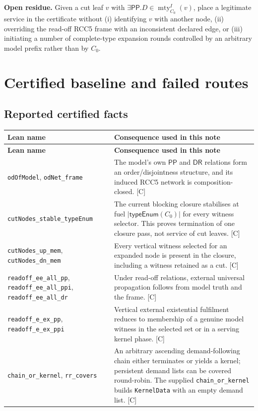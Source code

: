 \documentclass[11pt,letterpaper]{article}
\newcommand{\DR}{\ensuremath{\mathsf{DR}}}
\newcommand{\PP}{\ensuremath{\mathsf{PP}}}
\newcommand{\mty}{\operatorname{mty}}
\newcommand{\typeEnum}{\ensuremath{\mathsf{typeEnum}}}
\newcommand{\code}[1]{\nolinkurl{#1}}
\theoremstyle{definition}
\theoremstyle{plain}
\theoremstyle{remark}
\begin{document}
\begin{researchbox}
\textbf{Open residue.}
Given a cut leaf $v$ with
$\exists\PP.D\in\mty_{C_0}^{I}(v)$, place a legitimate service in the
certificate without (i) identifying $v$ with another node, (ii) overriding the
read-off RCC5 frame with an inconsistent declared edge, or (iii) initiating a
number of complete-type expansion rounds controlled by an arbitrary model
prefix rather than by $C_0$.
\end{researchbox}

\section{Certified baseline and failed routes}

\subsection{Reported certified facts}

\begin{longtable}{>{\raggedright\arraybackslash}p{}
                  >{\raggedright\arraybackslash}p{}}
\toprule
\textbf{Lean name} & \textbf{Consequence used in this note} \\
\midrule
\endfirsthead
\toprule
\textbf{Lean name} & \textbf{Consequence used in this note} \\
\midrule
\endhead
\code{odOfModel}, \code{odNet_frame} &
The model's own $\PP$ and $\DR$ relations form an order/disjointness structure,
and its induced RCC5 network is composition-closed. [C] \\
\code{cutNodes_stable_typeEnum} &
The current blocking closure stabilises at fuel $|\typeEnum(C_0)|$ for every
witness selector.  This proves termination of one closure pass, not service of
cut leaves. [C] \\
\code{cutNodes_up_mem}, \code{cutNodes_dn_mem} &
Every vertical witness selected for an expanded node is present in the closure,
including a witness retained as a cut. [C] \\
\code{readoff_ee_all_pp}, \code{readoff_ee_all_ppi},
\code{readoff_ee_all_dr} &
Under read-off relations, external universal propagation follows from model
truth and the frame. [C] \\
\code{readoff_e_ex_pp}, \code{readoff_e_ex_ppi} &
Vertical external existential fulfilment reduces to membership of a genuine
model witness in the selected set or in a serving kernel phase. [C] \\
\code{chain_or_kernel}, \code{rr_covers} &
An arbitrary ascending demand-following chain either terminates or yields a
kernel; persistent demand lists can be covered round-robin.  The supplied
\code{chain_or_kernel} builds \code{KernelData} with an empty demand list. [C] \\
\bottomrule
\end{longtable}
\end{document}
